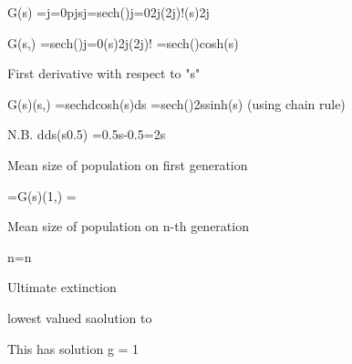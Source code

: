 G(s) =j=0pjsj=sech()j=02j(2j)!(s)2j   
 

G(s,) =sech()j=0(s)2j(2j)! =sech()cosh(s)  
 

First derivative with respect to "s"
 
G(s)(s,) =sechdcosh(s)ds =sech()2ssinh(s)   (using chain rule)
 
            N.B. dds(s0.5) =0.5s-0.5=2s
 
Mean size of population on first generation
 
=G(s)(1,) =  
 
Mean size of population on n-th generation
 
n=n  
 
Ultimate extinction
 
lowest valued saolution to 
 
This has solution g = 1
 

